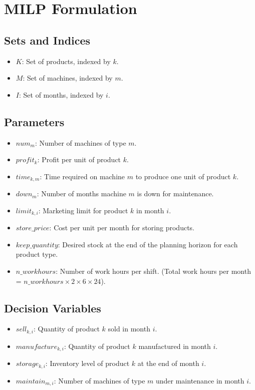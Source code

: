 \documentclass{article}
\begin{document}
\section*{MILP Formulation}

\subsection*{Sets and Indices}
\begin{itemize}
    \item $K$: Set of products, indexed by $k$.
    \item $M$: Set of machines, indexed by $m$.
    \item $I$: Set of months, indexed by $i$.
\end{itemize}

\subsection*{Parameters}
\begin{itemize}
    \item $num_m$: Number of machines of type $m$.
    \item $profit_k$: Profit per unit of product $k$.
    \item $time_{k,m}$: Time required on machine $m$ to produce one unit of product $k$.
    \item $down_m$: Number of months machine $m$ is down for maintenance.
    \item $limit_{k,i}$: Marketing limit for product $k$ in month $i$.
    \item $store\_price$: Cost per unit per month for storing products.
    \item $keep\_quantity$: Desired stock at the end of the planning horizon for each product type.
    \item $n\_workhours$: Number of work hours per shift. (Total work hours per month = $n\_workhours \times 2 \times 6 \times 24$).
\end{itemize}

\subsection*{Decision Variables}
\begin{itemize}
    \item $sell_{k,i}$: Quantity of product $k$ sold in month $i$.
    \item $manufacture_{k,i}$: Quantity of product $k$ manufactured in month $i$.
    \item $storage_{k,i}$: Inventory level of product $k$ at the end of month $i$.
    \item $maintain_{m,i}$: Number of machines of type $m$ under maintenance in month $i$.
\end{itemize}
\end{document}

